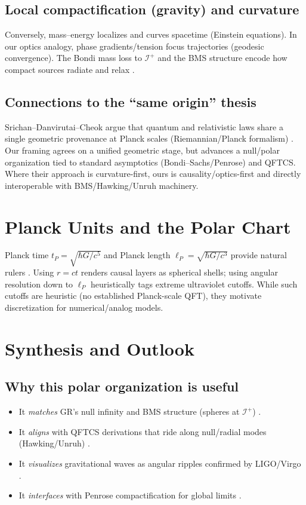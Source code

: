 \documentclass[12pt]{article}
\newcommand{\Iplus}{\mathcal{I}^+}
\begin{document}
\subsection{Local compactification (gravity) and curvature}
Conversely, mass–energy localizes and curves spacetime (Einstein equations). In our optics analogy, phase gradients/tension focus trajectories (geodesic convergence). The Bondi mass loss to $\Iplus$ and the BMS structure encode how compact sources radiate and relax \citep{Bondi1962,Sachs1962,BMS}.

\subsection{Connections to the ``same origin'' thesis}
Srichan–Danvirutai–Cheok argue that quantum and relativistic laws share a single geometric provenance at Planck scales (Riemannian/Planck formalism) \citep{CheokInspire}. Our framing agrees on a unified geometric stage, but advances a null/polar organization tied to standard asymptotics (Bondi–Sachs/Penrose) and QFTCS. Where their approach is curvature-first, ours is causality/optics-first and directly interoperable with BMS/Hawking/Unruh machinery.

\section{Planck Units and the Polar Chart}
Planck time $t_P=\sqrt{\hbar G/c^5}$ and Planck length $\ell_P=\sqrt{\hbar G/c^3}$ provide natural rulers \citep{PlanckUnits}. Using $r=ct$ renders causal layers as spherical shells; using angular resolution down to $\ell_P$ heuristically tags extreme ultraviolet cutoffs. While such cutoffs are heuristic (no established Planck-scale QFT), they motivate discretization for numerical/analog models.

\section{Synthesis and Outlook}
\subsection{Why this polar organization is useful}
\begin{itemize}[leftmargin=1.2em]
\item It \emph{matches} GR’s null infinity and BMS structure (spheres at $\Iplus$) \citep{Bondi1962,Sachs1962,BMS,NullInfinity}.
\item It \emph{aligns} with QFTCS derivations that ride along null/radial modes (Hawking/Unruh) \citep{BirrellDavies1982,Hawking1975,Unruh1976,ParkerToms2009}.
\item It \emph{visualizes} gravitational waves as angular ripples confirmed by LIGO/Virgo \citep{Abbott2016GW}.
\item It \emph{interfaces} with Penrose compactification for global limits \citep{Penrose1964,NullInfinity}.
\end{itemize}
\end{document}
